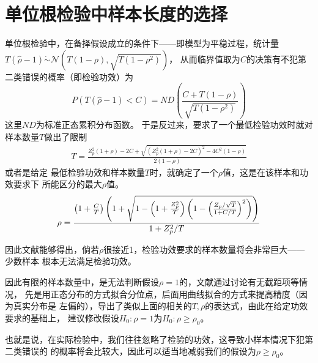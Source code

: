 \documentclass[cn]{homework}
\begin{document}
    \section{单位根检验中样本长度的选择}
    单位根检验中，在备择假设成立的条件下——即模型为平稳过程，统计量
    $T(\hat\rho-1)\dot\sim\mathcal N\left(T(1-\rho),\sqrt{T(1-\rho^2)}\right)$，
    从而临界值取为$C$的决策有不犯第二类错误的概率（即检验功效）为
    \[P(T(\hat\rho-1)<C)=ND\left(\frac{C+T(1-\rho)}{\sqrt{T(1-\rho^2)}}\right)\]
    这里$ND$为标准正态累积分布函数。
    于是反过来，要求了一个最低检验功效时就对样本数量$T$做出了限制
    \[\begin{aligned}
        T=\frac{Z^2_p(1+\rho)-2C+\sqrt{(Z_p^2(1+\rho)-2C)^2-4C^2(1-\rho)}}{2(1-\rho)}
    \end{aligned}\]
    或者是给定
    最低检验功效和样本数量$T$时，就确定了一个$\rho$值，这是在该样本和功效要求下
    所能区分的最大$\rho$值。
    \[\rho=\frac{\left(1+\frac{C}{T}\right)\left(1+\sqrt{%
        1-\left(1+\frac{Z_p^2}{T}\right)
        \left(1-\left(\frac{Z_p/\sqrt{T}}{1+C/T}\right)^2\right)
    }\right)}{1+Z_p^2/T}\]

    因此文献能够得出，倘若$\rho$很接近1，检验功效要求的样本数量将会非常巨大——少数样本
    根本无法满足检验功效。

    因此有限的样本数量中，是无法判断假设$\rho=1$的，文献通过讨论有无截距项等情况，
    先是用正态分布的方式拟合分位点，后面用曲线拟合的方式来提高精度（因为真实分布是
    左偏的），导出了类似上面的相关的$T,\rho$的表达式，由此在给定功效要求的基础上，
    建议修改假设$H_0:\rho=1$为$H_0:\rho\geq\rho_0$。

    也就是说，在实际检验中，我们往往忽略了检验的功效，这导致小样本情况下犯第二类错误的
    的概率将会比较大，因此可以适当地减弱我们的假设为$\rho\geq\rho_0$。
\end{document}
